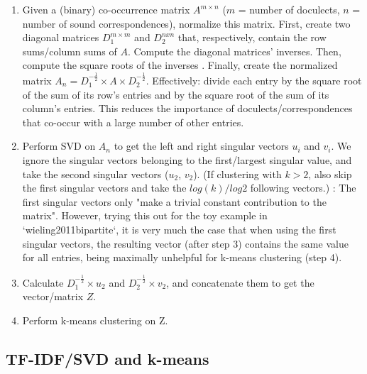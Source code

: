 \documentclass{article}
\begin{document}
\begin{enumerate}
\item 
Given a (binary) co-occurrence matrix $A^{m \times n}$ ($m$ = number of doculects, $n$ = number of sound correspondences), normalize this matrix.
First, create two diagonal matrices $D_1^{m \times m}$ and $D_2^{n x n}$ that, respectively, contain the row sums/column sums of $A$.
Compute the diagonal matrices' inverses. 
Then, compute the square roots of the inverses
.
Finally, create the normalized matrix $A_n = D_1^{-\frac{1}{2}} \times A \times D_2^{-\frac{1}{2}}$.
Effectively: divide each entry by the square root of the sum of its row's entries and by the square root of the sum of its column's entries.
This reduces the importance of doculects/correspondences that co-occur with a large number of other entries.

\item
Perform SVD on $A_n$ to get the left and right singular vectors $u_i$ and $v_i$.
We ignore the singular vectors belonging to the first/largest singular value, and take the second singular vectors ($u_2$, $v_2$).
(If clustering with $k > 2$, also skip the first singular vectors and take the $log(k)/log2$ following vectors.)
\cite{kluger2003spectral}: The first singular vectors only "make a trivial constant contribution to the matrix".
However, trying this out for the toy example in `wieling2011bipartite`, it is very much the case that when using the first singular vectors, the resulting vector (after step 3) contains the same value for all entries, being maximally unhelpful for k-means clustering (step 4).

\item
Calculate $D_1^{-\frac{1}{2}} \times u_2$ and $D_2^{-\frac{1}{2}} \times v_2$, and concatenate them to get the vector/matrix $Z$. 

\item
Perform k-means clustering on Z.

\end{enumerate}


\subsection{TF-IDF/SVD and k-means}
\end{document}
